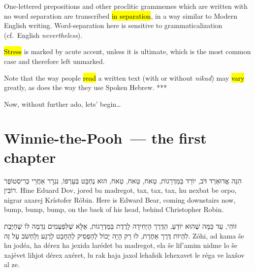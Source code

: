 One-lettered prepositions and other proclitic grammemes which are written with no word separation are transcribed \hl{in separation}, in a way similar to Modern English writing. Word-separation here is sensitive to grammaticalization (cf.~English \emph{nevertheless}).

\hl{Stress} is marked by acute accent, unless it is ultimate, which is the most common case and therefore left unmarked.


Note that the way people \hl{read} a written text (with or without \emph{nikud}) may \hl{vary} greatly, as does the way they use Spoken Hebrew. ***

Now, without further ado, lets' begin…



\newpage

\section*{Winnie-the-Pooh~— the first chapter}

\newparagraph{}

\begin{sentence}
	{הִנֵּה אֱדוּאַרְד דֹּב, יוֹרֵד בַּמַּדְרֵגוֹת, טַאח, טַאח, טַאח, הוּא נֶחְבָּט בְּעָרְפּוֹ, נִגְרָר אַחֲרֵי כְּרִיסְטוֹפֶר רוֹבִּין.}
	{Hine Eduard Dov, jored ba madregot, tax, tax, tax, hu nexbat be orpo, nigrar axarej Krístofer Róbin.}
	{Here is Edward Bear, coming downstairs now, bump, bump, bump, on the back of his head, behind Christopher Robin.}
\end{sentence}

\begin{sentence}
	{זוֹהִי, עַד כַּמָּה שֶׁהוּא יוֹדֵעַ, הַדֶּרֶך הַיְּחִידָה לָרֶדֶת בַּמַּדְרֵגוֹת, אֶלָּא שֶׁלִּפְעָמִים נִדְמֶה לוֹ שֶׁחַיֶּבֶת לִהְיוֹת דֶּרֶך אַחֶרֶת, לוּ רַק הָיָה יָכוֹל לְהַפְסִיק לְהֵחָבֵט לְרֶגַע וְלַחְשֹׁב עַל זֶה.}
	{Zóhi, ad kama še hu jodéa, ha dérex ha jexida larédet ba madregot, ela še lif'amim nidme lo še xajévet lihjot dérex axéret, lu rak haja jaxol lehafsik lehexavet le réga ve laxšov al ze.}
	{}
\end{sentence}

